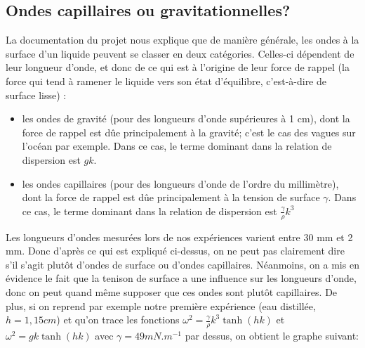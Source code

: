 \documentclass{report}
\begin{document}
\subsection{Ondes capillaires ou gravitationnelles?}
La documentation du projet nous explique que de manière générale, les ondes à la surface d’un liquide peuvent se classer en deux catégories. Celles-ci dépendent de leur longueur d’onde, et donc de ce qui est à l’origine de leur force de rappel (la force qui tend à ramener le liquide vers son état d’équilibre, c’est-à-dire de surface lisse) : 

\begin{itemize}[label=]
    \item les ondes de gravité (pour des longueurs d’onde supérieures à 1 cm), dont la force de rappel est dûe principalement à la gravité; c’est le cas des vagues sur l’océan par exemple. Dans ce cas, le terme dominant dans la relation de dispersion est  $gk$.
    \item les ondes capillaires (pour des longueurs d’onde de l’ordre du millimètre), dont la force de rappel est dûe principalement à la tension de surface $\gamma$. Dans ce cas, le terme dominant dans la relation de dispersion est $\frac{\gamma}{\rho}k^3$
\end{itemize}

Les longueurs d'ondes mesurées lors de nos expériences varient entre 30 mm et 2 mm. Donc d'après ce qui est expliqué ci-dessus, on ne peut pas clairement dire s'il s'agit plutôt d'ondes de surface ou d'ondes capillaires. Néanmoins, on a mis en évidence le fait que la tenison de surface a une influence sur les longueurs d'onde, donc on peut quand même supposer que ces ondes sont plutôt capillaires. De plus, si on reprend par exemple notre première expérience (eau distillée, $h=1,15 cm$) et qu’on trace les fonctions $\omega^2=\frac{\gamma}{\rho}k^3 \tanh{(hk)}$ et $\omega^2=gk\tanh{(hk)}$ avec $\gamma = 49 mN.m^{-1}$ par dessus, on obtient le graphe suivant:

\end{document}
